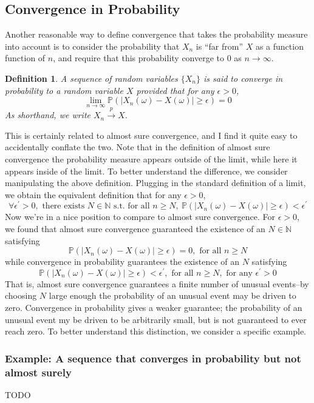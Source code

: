 \documentclass[12pt]{article}
\newcommand*{\abs}[1]{\left\lvert#1\right\rvert}
\newcommand{\Prob}{\mathbb{P}}
\newtheorem{definition}{Definition}
\begin{document}
\subsection{Convergence in Probability}
Another reasonable way to define convergence that takes the probability measure into account is to consider the probability that $X_n$ is ``far from'' $X$ as a function function of $n$, and require that this 
probability converge to $0$ as $n \to \infty$.  
\begin{definition}
A sequence of random variables $\{X_n\}$ is said to converge in probability to a random variable $X$ provided that for any $\epsilon > 0$,
\[\lim_{n \to \infty} \Prob\left(\abs{X_n(\omega) - X(\omega)} \geq \epsilon \right) = 0\]
As shorthand, we write $X_n \overset{p}{\to} X$.
\end{definition}
This is certainly related to almost sure convergence, and I find it quite easy to accidentally conflate the two. Note that in the definition of almost sure convergence the probability measure appears outside of the limit, 
while here it appears inside of the limit. To better understand the difference, we consider manipulating the above definition. 
Plugging in the standard definition of a limit, we obtain the equivalent 
definition that for any $\epsilon > 0$,
\[\forall \epsilon^\prime > 0, \text{ there exists } N \in \mathbb{N} \text{ s.t. for all } n \geq N, \ \Prob\left(\abs{X_n(\omega) - X(\omega)} \geq \epsilon \right) < \epsilon^\prime \]
Now we're in a nice position to compare to almost sure convergence. For $\epsilon > 0$, we found that almost sure convergence guaranteed the existence of an $N \in \mathbb{N}$
satisfying 
\[\Prob(\abs{X_n(\omega) - X(\omega)} \geq \epsilon) = 0, \text{ for all } n \geq N\]
while convergence in probability guarantees the existence of an $N$ satisfying 
\[\Prob(\abs{X_n(\omega) - X(\omega)} \geq \epsilon) < \epsilon^\prime, \text{ for all } n \geq N, \text{ for any } \epsilon^\prime > 0\]
That is, almost sure convergence guarantees a finite number of unusual events--by choosing $N$ large enough the probability of an unusual event may be driven to zero. Convergence in 
probability gives a weaker guarantee; the probability of an unusual event my be driven to be arbitrarily small, but is not guaranteed to ever reach zero. To better understand this distinction, 
we consider a specific example. 

\subsubsection{Example: A sequence that converges in probability but not almost surely}
TODO
\end{document}
